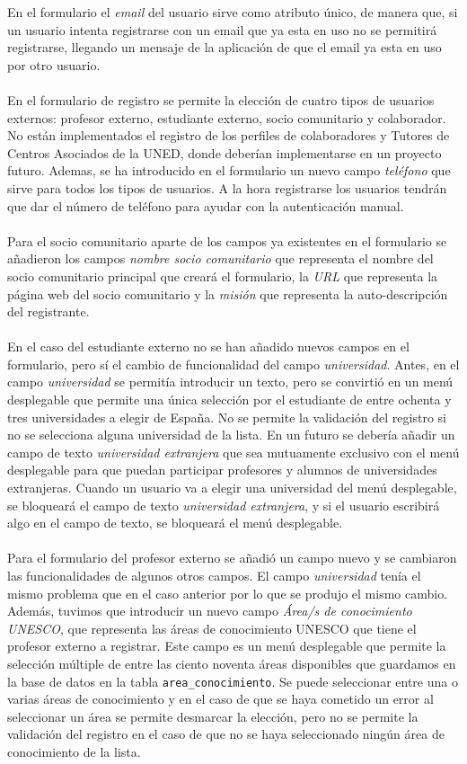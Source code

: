 \documentclass[11pt]{book}
\begin{document}
 En el formulario el \emph{email} del usuario sirve como atributo único, de manera que, si un usuario intenta registrarse con un email que ya esta en uso no se permitirá registrarse, llegando un mensaje de la aplicación de que el email ya esta en uso por otro usuario. \\\\
 En el formulario de registro se permite la elección de cuatro tipos de usuarios externos: profesor externo, estudiante externo, socio comunitario y colaborador. No están implementados el registro de los perfiles de colaboradores y Tutores de Centros Asociados de la UNED, donde deberían implementarse en un proyecto futuro. Ademas, se ha introducido en el formulario un nuevo campo \emph{teléfono} que sirve para todos los tipos de usuarios. A la hora registrarse los usuarios tendrán que dar el número de teléfono para ayudar con la autenticación manual.\\\\
 Para el socio comunitario aparte de los campos ya existentes en el formulario se añadieron los campos \emph{nombre socio comunitario} que representa el nombre del socio comunitario
 principal que creará el formulario, la \emph{URL} que representa la página web del socio comunitario y la \emph{misión} que representa la auto-descripción del registrante. \\\\
 En el caso del estudiante externo no se han añadido nuevos campos en el formulario, pero sí el cambio de funcionalidad del campo \emph{universidad}. Antes, en el campo \emph{universidad} se permitía introducir un texto, pero se convirtió en un menú desplegable que permite una única selección por el estudiante de entre ochenta y tres universidades a elegir de España. No se permite la validación del registro si no se selecciona alguna universidad de la lista. En un futuro se debería añadir un campo de texto \emph{universidad extranjera} que sea mutuamente exclusivo con el menú desplegable para que puedan participar profesores y alumnos de universidades extranjeras. Cuando un usuario va a elegir una universidad del menú desplegable, se bloqueará el campo de texto \emph{universidad extranjera}, y si el usuario escribirá algo en el campo de texto, se bloqueará el menú desplegable. \\\\
 Para el formulario del profesor externo se añadió un campo nuevo y se cambiaron las funcionalidades de algunos otros campos. El campo \emph{universidad} tenía el mismo problema que en el caso anterior por lo que se produjo el mismo cambio. Además, tuvimos que introducir un nuevo campo \emph{Área/s de conocimiento UNESCO}, que representa las áreas de conocimiento UNESCO que tiene el profesor externo a registrar. Este campo es un menú desplegable que permite la selección múltiple de entre las ciento noventa áreas disponibles que guardamos en la base de datos en la tabla \texttt{area\_conocimiento}. Se puede seleccionar entre una o varias áreas de conocimiento y en el caso de que se haya cometido un error al seleccionar un área se permite desmarcar la elección, pero no se permite la validación del registro en el caso de que no se haya seleccionado ningún área de conocimiento de la lista.\\\\
\end{document}
